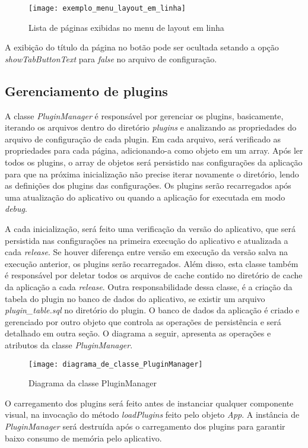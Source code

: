 \begin{figure}[H]
	\texttt{[image: exemplo\_menu\_layout\_em\_linha]}
	\centering
	\caption{Lista de páginas exibidas no menu de layout em linha}
\end{figure}

A exibição do título da página no botão pode ser ocultada setando a opção \textit{showTabButtonText} para \textit{false} no arquivo de configuração.


\subsection{Gerenciamento de plugins}\label{sec:solucao-desenvolvida}
A classe \textit{PluginManager} é responsável por gerenciar os plugins, basicamente, iterando os arquivos dentro do diretório \textit{plugins} e analizando as propriedades do arquivo de configuração de cada plugin. Em cada arquivo, será verificado as propriedades para cada página, adicionando-a como objeto em um array. Após ler todos os plugins, o array de objetos será persistido nas configurações da aplicação para que na próxima inicialização não precise iterar novamente o diretório, lendo as definições dos plugins das configurações. Os plugins serão recarregados após uma atualização do aplicativo ou quando a aplicação for executada em modo \textit{debug}.\par
A cada inicialização, será feito uma verificação da versão do aplicativo, que será persistida nas configurações na primeira execução do aplicativo e atualizada a cada \textit{release}. Se houver diferença entre versão em execução da versão salva na execução anterior, os plugins serão recarregados. Além disso, esta classe também é responsável por deletar todos os arquivos de cache contido no diretório de cache da aplicação a cada \textit{release}. Outra responsabilidade dessa classe, é a criação da tabela do plugin no banco de dados do aplicativo, se existir um arquivo \textit{plugin\_table.sql} no diretório do plugin. O banco de dados da aplicação é criado e gerenciado por outro objeto que controla as operações de persistência e será detalhado em outra seção. O diagrama a seguir, apresenta as operações e atributos da classe \textit{PluginManager}.

\begin{figure}[H]
	\texttt{[image: diagrama\_de\_classe\_PluginManager]}
	\centering
	\caption{Diagrama da classe PluginManager}
\end{figure}

O carregamento dos plugins será feito antes de instanciar qualquer componente visual, na invocação do método \textit{loadPlugins} feito pelo objeto \textit{App}. A instância de \textit{PluginManager} será destruída após o carregamento dos plugins para garantir baixo consumo de memória pelo aplicativo.


